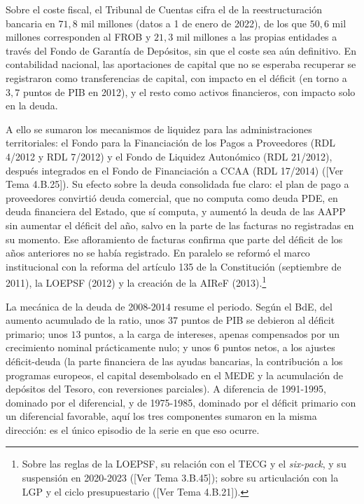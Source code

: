 \documentclass[10pt,a4paper]{article}
\newcommand{\authorfont}[1]{{\fontfamily{EBGaramond-TLF}\selectfont #1}}
\begin{document}
Sobre el coste fiscal, el Tribunal de Cuentas cifra el de la reestructuración bancaria en $71,8$ mil millones (datos a 1 de enero de 2022), de los que $50,6$ mil millones corresponden al FROB y $21,3$ mil millones a las propias entidades a través del Fondo de Garantía de Depósitos, sin que el coste sea aún definitivo. En contabilidad nacional, las aportaciones de capital que no se esperaba recuperar se registraron como transferencias de capital, con impacto en el déficit (en torno a $3,7$ puntos de PIB en 2012), y el resto como activos financieros, con impacto solo en la deuda.

A ello se sumaron los mecanismos de liquidez para las administraciones territoriales: el Fondo para la Financiación de los Pagos a Proveedores (RDL 4/2012 y RDL 7/2012) y el Fondo de Liquidez Autonómico (RDL 21/2012), después integrados en el Fondo de Financiación a CCAA (RDL 17/2014) ([\authorfont{Ver Tema 4.B.25}]). Su efecto sobre la deuda consolidada fue claro: el plan de pago a proveedores convirtió deuda comercial, que no computa como deuda PDE, en deuda financiera del Estado, que sí computa, y aumentó la deuda de las AAPP sin aumentar el déficit del año, salvo en la parte de las facturas no registradas en su momento. Ese afloramiento de facturas confirma que parte del déficit de los años anteriores no se había registrado. En paralelo se reformó el marco institucional con la reforma del artículo 135 de la Constitución (septiembre de 2011), la LOEPSF (2012) y la creación de la AIReF (2013).\footnote{%
    Sobre las reglas de la LOEPSF, su relación con el TECG y el \textit{six-pack}, y su suspensión en 2020-2023 ([\authorfont{Ver Tema 3.B.45}]); sobre su articulación con la LGP y el ciclo presupuestario ([\authorfont{Ver Tema 4.B.21}]).
}

La mecánica de la deuda de 2008-2014 resume el periodo. Según el BdE, del aumento acumulado de la ratio, unos $37$ puntos de PIB se debieron al déficit primario; unos $13$ puntos, a la carga de intereses, apenas compensados por un crecimiento nominal prácticamente nulo; y unos $6$ puntos netos, a los ajustes déficit-deuda (la parte financiera de las ayudas bancarias, la contribución a los programas europeos, el capital desembolsado en el MEDE y la acumulación de depósitos del Tesoro, con reversiones parciales). A diferencia de 1991-1995, dominado por el diferencial, y de 1975-1985, dominado por el déficit primario con un diferencial favorable, aquí los tres componentes sumaron en la misma dirección: es el único episodio de la serie en que eso ocurre.
\end{document}
